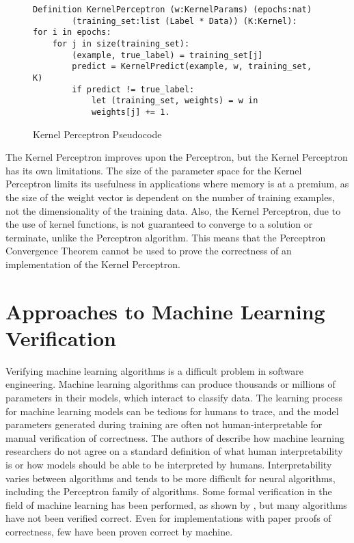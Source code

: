 \begin{figure}
    \caption{Kernel Perceptron Pseudocode}
    \label{KernelPerceptronPseodo}
    \begin{lstlisting}
Definition KernelPerceptron (w:KernelParams) (epochs:nat)
        (training_set:list (Label * Data)) (K:Kernel):
for i in epochs:
    for j in size(training_set):
        (example, true_label) = training_set[j]
        predict = KernelPredict(example, w, training_set, K)
        if predict != true_label:
            let (training_set, weights) = w in
            weights[j] += 1.
    \end{lstlisting}
\end{figure}

The Kernel Perceptron improves upon the Perceptron, but the Kernel Perceptron has its own limitations. The size of the parameter space for the Kernel Perceptron limits its usefulness in applications where memory is at a premium, as the size of the weight vector is dependent on the number of training examples, not the dimensionality of the training data. Also, the Kernel Perceptron, due to the use of kernel functions, is not guaranteed to converge to a solution or terminate, unlike the Perceptron algorithm. This means that the Perceptron Convergence Theorem cannot be used to prove the correctness of an implementation of the Kernel Perceptron.
\section{Approaches to Machine Learning Verification}\label{MLVerificationSection}
Verifying machine learning algorithms is a difficult problem in software engineering. Machine learning algorithms can produce thousands or millions of parameters in their models, which interact to classify data. The learning process for machine learning models can be tedious for humans to trace, and the model parameters generated during training are often not human-interpretable for manual verification of correctness. The authors of \cite{BF16} describe how machine learning researchers do not agree on a standard definition of what human interpretability is or how models should be able to be interpreted by humans. Interpretability varies between algorithms and tends to be more difficult for neural algorithms, including the Perceptron family of algorithms. Some formal verification in the field of machine learning has been performed, as shown by \cite{TD05}, but many algorithms have not been verified correct. Even for implementations with paper proofs of correctness, few have been proven correct by machine.
